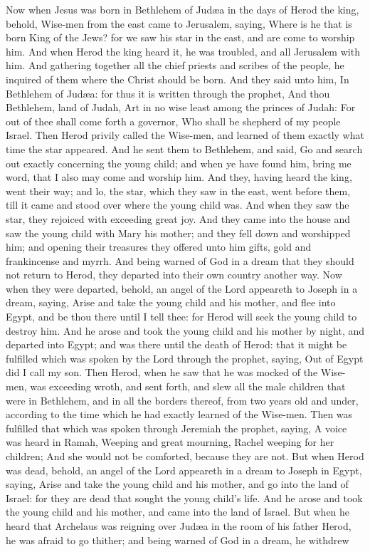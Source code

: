 Now when Jesus was born in Bethlehem of Judæa in the days of Herod the king, behold, Wise-men from the east came to Jerusalem, saying, Where is he that is born King of the Jews? for we saw his star in the east, and are come to worship him. And when Herod the king heard it, he was troubled, and all Jerusalem with him. And gathering together all the chief priests and scribes of the people, he inquired of them where the Christ should be born. And they said unto him, In Bethlehem of Judæa: for thus it is written through the prophet,  And thou Bethlehem, land of Judah, Art in no wise least among the princes of Judah: For out of thee shall come forth a governor, Who shall be shepherd of my people Israel.  Then Herod privily called the Wise-men, and learned of them exactly what time the star appeared. And he sent them to Bethlehem, and said, Go and search out exactly concerning the young child; and when ye have found him, bring me word, that I also may come and worship him. And they, having heard the king, went their way; and lo, the star, which they saw in the east, went before them, till it came and stood over where the young child was. And when they saw the star, they rejoiced with exceeding great joy. And they came into the house and saw the young child with Mary his mother; and they fell down and worshipped him; and opening their treasures they offered unto him gifts, gold and frankincense and myrrh. And being warned of God in a dream that they should not return to Herod, they departed into their own country another way.  Now when they were departed, behold, an angel of the Lord appeareth to Joseph in a dream, saying, Arise and take the young child and his mother, and flee into Egypt, and be thou there until I tell thee: for Herod will seek the young child to destroy him. And he arose and took the young child and his mother by night, and departed into Egypt; and was there until the death of Herod: that it might be fulfilled which was spoken by the Lord through the prophet, saying, Out of Egypt did I call my son.  Then Herod, when he saw that he was mocked of the Wise-men, was exceeding wroth, and sent forth, and slew all the male children that were in Bethlehem, and in all the borders thereof, from two years old and under, according to the time which he had exactly learned of the Wise-men. Then was fulfilled that which was spoken through Jeremiah the prophet, saying,  A voice was heard in Ramah, Weeping and great mourning, Rachel weeping for her children; And she would not be comforted, because they are not.  But when Herod was dead, behold, an angel of the Lord appeareth in a dream to Joseph in Egypt, saying, Arise and take the young child and his mother, and go into the land of Israel: for they are dead that sought the young child’s life. And he arose and took the young child and his mother, and came into the land of Israel. But when he heard that Archelaus was reigning over Judæa in the room of his father Herod, he was afraid to go thither; and being warned of God in a dream, he withdrew 